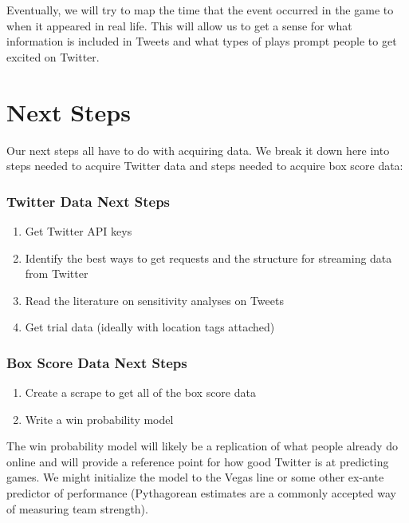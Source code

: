 \documentclass[12pt]{article}
\begin{document}
\noindent
Eventually, we will try to map the time that the event occurred in the game to when it appeared in real life. This will allow us to get a sense for what information is included in Tweets and what types of plays prompt people to get excited on Twitter.

\section{Next Steps}

Our next steps all have to do with acquiring data. We break it down here into steps needed to acquire Twitter data and steps needed to acquire box score data:

\subsubsection*{Twitter Data Next Steps}
\begin{enumerate}
	\item Get Twitter API keys
	\item Identify the best ways to get requests and the structure for streaming data from Twitter
	\item Read the literature on sensitivity analyses on Tweets
	\item Get trial data (ideally with location tags attached)
\end{enumerate}

\subsubsection*{Box Score Data Next Steps}
\begin{enumerate}
	\item Create a scrape to get all of the box score data
	\item Write a win probability model
\end{enumerate}

\noindent
The win probability model will likely be a replication of what people already do online and will provide a reference point for how good Twitter is at predicting games. We might initialize the model to the Vegas line or some other ex-ante predictor of performance (Pythagorean estimates are a commonly accepted way of measuring team strength). 
\end{document}
